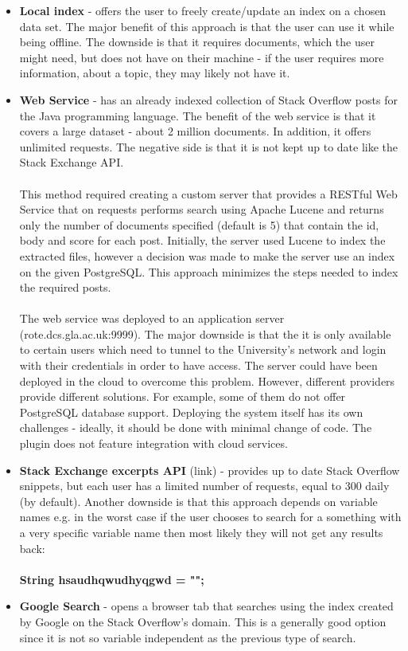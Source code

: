 \documentclass{l4proj}
\begin{document}
\begin{itemize}

\item \textbf{Local index} - offers the user to freely create/update an index on a chosen data set. The major benefit of this approach is that the user can use it while being offline. The downside is that it requires documents, which the user might need, but does not have on their machine - if the user requires more information, about a topic, they may likely not have it.  

\item \textbf{Web Service} - has an already indexed collection of Stack Overflow posts for the Java programming language.  The benefit of the web service is that it covers a large dataset - about 2 million documents. In addition, it offers unlimited requests. The negative side is that it is not kept up to date like the Stack Exchange API. 
\\
\\
This method required creating a custom server that provides a RESTful Web Service that on requests performs search using Apache Lucene and returns only the number of documents specified (default is 5) that contain the id, body and score for each post. 
Initially, the server used Lucene to index the extracted files, however a decision was made to make the server use an index on the given PostgreSQL. This approach minimizes the steps needed to index the required posts.
\\
\\
The web service was deployed to an application server (rote.dcs.gla.ac.uk:9999). The major downside is that the it is only available to certain users which need to tunnel to the University's network and login with their credentials in order to have access. The server could have been deployed in the cloud to overcome this problem. However, different providers provide different solutions. For example, some of them do not offer PostgreSQL database support. Deploying the system itself has its own challenges - ideally, it should be done with minimal change of code. The plugin does not feature integration with cloud services. 

\item \textbf{Stack Exchange excerpts API} (link) - provides up to date Stack Overflow snippets, but each user has a limited number of requests, equal to 300 daily (by default). Another downside is that this approach depends on variable names e.g. in the worst case if the user chooses to search for a something with a very specific variable name then most likely they will not get any results back:
\\
\\
\textbf{String hsaudhqwudhyqgwd = "";}

\item \textbf{Google Search} - opens a browser tab that searches using the index created by Google on the Stack Overflow's domain. This is a generally good option since it is not so variable independent as the previous type of search.

\end{itemize} 
\end{document}
